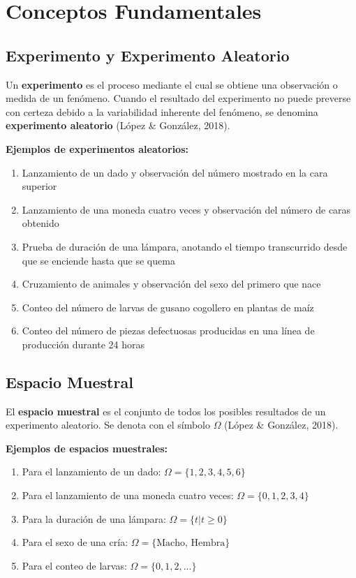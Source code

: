 \documentclass[
  spanish,
  letterpaper,
]{book}
\begin{document}
\section{Conceptos Fundamentales}\label{conceptos-fundamentales}

\subsection{Experimento y Experimento
Aleatorio}\label{experimento-y-experimento-aleatorio}

Un \textbf{experimento} es el proceso mediante el cual se obtiene una
observación o medida de un fenómeno. Cuando el resultado del experimento
no puede preverse con certeza debido a la variabilidad inherente del
fenómeno, se denomina \textbf{experimento aleatorio} (López \& González,
2018).

\textbf{Ejemplos de experimentos aleatorios:}

\begin{enumerate}
\def\labelenumi{\arabic{enumi}.}
\item
  Lanzamiento de un dado y observación del número mostrado en la cara
  superior
\item
  Lanzamiento de una moneda cuatro veces y observación del número de
  caras obtenido
\item
  Prueba de duración de una lámpara, anotando el tiempo transcurrido
  desde que se enciende hasta que se quema
\item
  Cruzamiento de animales y observación del sexo del primero que nace
\item
  Conteo del número de larvas de gusano cogollero en plantas de maíz
\item
  Conteo del número de piezas defectuosas producidas en una línea de
  producción durante 24 horas
\end{enumerate}

\subsection{Espacio Muestral}\label{espacio-muestral}

El \textbf{espacio muestral} es el conjunto de todos los posibles
resultados de un experimento aleatorio. Se denota con el símbolo
\(\Omega\) (López \& González, 2018).

\textbf{Ejemplos de espacios muestrales:}

\begin{enumerate}
\def\labelenumi{\arabic{enumi}.}
\item
  Para el lanzamiento de un dado: \(\Omega = \{1, 2, 3, 4, 5, 6\}\)
\item
  Para el lanzamiento de una moneda cuatro veces:
  \(\Omega = \{0, 1, 2, 3, 4\}\)
\item
  Para la duración de una lámpara: \(\Omega = \{t | t \geq 0\}\)
\item
  Para el sexo de una cría: \(\Omega = \{\text{Macho, Hembra}\}\)
\item
  Para el conteo de larvas: \(\Omega = \{0, 1, 2, ...\}\)
\end{enumerate}
\end{document}
